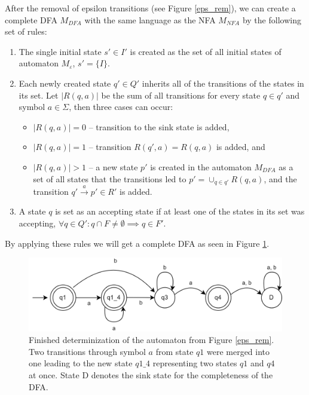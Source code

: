 \pagebreak
After the removal of epsilon transitions (see Figure \ref{eps_rem}), we can create a complete DFA $M_{DFA}$ with the same language as the NFA $M_{NFA}$ by the following set of rules:

\begin{enumerate}
    \item The single initial state $s' \in I'$  is created as the set of all initial states of automaton $M_\varepsilon$, $s'=\{I\}$.
    \item Each newly created state $q' \in Q'$ inherits all of the transitions of the states in its set. Let $|R(q,a)|$ be the sum of all transitions for every state $q \in q'$ and symbol $a \in \Sigma$, then three cases can occur:
    \begin{itemize}
        \item $|R(q, a)| = 0$ -- transition to the sink state is added,
        \item $|R(q, a)| = 1$ -- transition $R(q', a) = R(q, a)$ is added, and
        \item $|R(q, a)| > 1$ -- a new state $p'$ is created in the automaton $M_{DFA}$ as a set of all states that the transitions led to $p' = \cup_{q \in q'} R(q, a)$, and the  transition $q' \xrightarrow{a} p' \in R'$ is added.
    \end{itemize}
    \item A state $q$ is set as an accepting state if at least one of the states in its set was accepting, $\forall q \in Q': q \cap F \neq \emptyset \implies q \in F'$.
\end{enumerate}

By applying these rules we will get a complete DFA as seen in Figure \ref{done_det}.

\begin{figure}[!hbt]
    \label{done_det}
    \centering
    \includegraphics[width=0.8\linewidth]{obrazky-figures/done_deter.drawio.png}
    \caption{Finished determinization of the automaton from Figure \ref{eps_rem}. Two transitions through symbol $a$ from state $q1$ were merged into one leading to the new state $q1\_4$ representing two states $q1$ and $q4$ at once. State D denotes the sink state for the completeness of the DFA.}
\end{figure}
\vspace{0.3cm}

